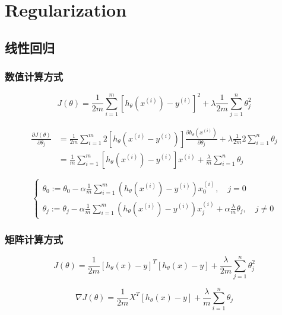 \section{Regularization}
\subsection{线性回归}


\subsubsection{数值计算方式}
\begin{equation}
	J(\theta) = \frac{1}{2m}\sum_{i=1}^m [h_\theta(x^{(i)})-y^{(i)}]^2 + \lambda \frac{1}{2m} \sum_{j=1}^n\theta_j^2
\end{equation}

\begin{equation}\begin{aligned}
	\frac{\partial{J(\theta)}}{\partial{\theta_j}} &= \frac{1}{2m}\sum_{i=1}^m 2[h_\theta(x^{(i)}-y^{(i)})] \frac{\partial{h_\theta(x^{(i)})}}{\partial{\theta_j}} + \lambda \frac{1}{2m} 2 \sum_{i=1}^n \theta_j \\
	    &= \frac{1}{m}\sum_{i=1}^m[h_\theta(x^{(i)})-y^{(i)}]x^{(i)} + \frac{\lambda}{m}\sum_{i=1}^n \theta_j
\end{aligned}\end{equation}

\[\begin{cases}
	\theta_0 := \theta_0 - \alpha \frac{1}{m} \sum_{i=1}^m(h_\theta(x^{(i)}) - y^{(i)})x_0^{(i)}, \quad j=0 \\
	\theta_j := \theta_j - \alpha \frac{1}{m} \sum_{i=1}^m(h_\theta(x^{(i)}) - y^{(i)})x_j^{(i)} + \alpha\frac{\lambda}{m}\theta_j, \quad j \neq 0
\end{cases}\]



\subsubsection{矩阵计算方式}
\begin{equation}
	J(\theta) = \frac{1}{2m} \left[h_\theta(x) - y\right]^T \left[ h_\theta(x) - y\right] + \frac{\lambda}{2m} \sum_{j=1}^n\theta_j^2
\end{equation}

\begin{equation}
	\nabla J(\theta) = \frac{1}{2m} X^T \left[h_\theta(x) - y\right] + \frac{\lambda}{m}\sum_{i=1}^n \theta_j
\end{equation}


